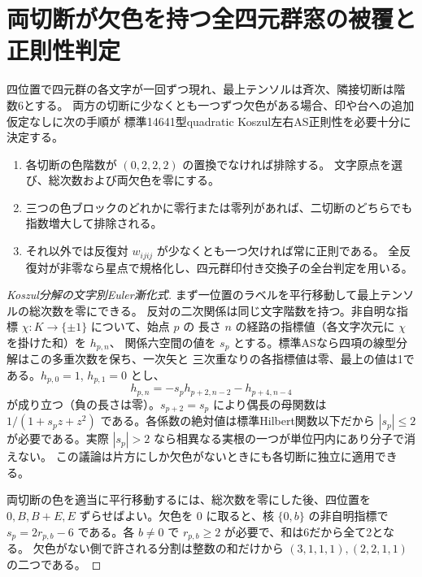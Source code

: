 \section{両切断が欠色を持つ全四元群窓の被覆と正則性判定}
\label{sec:klein-missing-color-coverage}
\begin{theorem}\label{thm:klein-missing-color-coverage}
四位置で四元群の各文字が一回ずつ現れ、最上テンソルは斉次、隣接切断は階数6とする。
両方の切断に少なくとも一つずつ欠色がある場合、印や台への追加仮定なしに次の手順が
標準14641型quadratic Koszul左右AS正則性を必要十分に決定する。
\begin{enumerate}
\item 各切断の色階数が $(0,2,2,2)$ の置換でなければ排除する。
文字原点を選び、総次数および両欠色を零にする。
\item 三つの色ブロックのどれかに零行または零列があれば、二切断のどちらでも指数増大して排除される。
\item それ以外では反復対 $w_{ijij}$ が少なくとも一つ欠ければ常に正則である。
全反復対が非零なら星点で規格化し、四元群印付き交換子の全台判定を用いる。
\end{enumerate}
\end{theorem}
\begin{proof}[Koszul分解の文字別Euler漸化式]
まず一位置のラベルを平行移動して最上テンソルの総次数を零にできる。
反対の二次関係は同じ文字階数を持つ。非自明な指標 $\chi:K\to\{\pm1\}$ について、始点 $p$ の
長さ $n$ の経路の指標値（各文字次元に $\chi$ を掛けた和）を $h_{p,n}$、
関係六空間の値を $s_p$ とする。標準ASなら四項の線型分解はこの多重次数を保ち、一次矢と
三次重なりの各指標値は零、最上の値は1である。$h_{p,0}=1$, $h_{p,1}=0$ とし、
\[
           h_{p,n}=-s_p h_{p+2,n-2}-h_{p+4,n-4}
\]
が成り立つ（負の長さは零）。$s_{p+2}=s_p$ により偶長の母関数は
$1/(1+s_p z+z^2)$ である。各係数の絶対値は標準Hilbert関数以下だから
$|s_p|\le2$ が必要である。実際 $|s_p|>2$ なら相異なる実根の一つが単位円内にあり分子で消えない。
この議論は片方にしか欠色がないときにも各切断に独立に適用できる。

両切断の色を適当に平行移動するには、総次数を零にした後、四位置を
$0,B,B+E,E$ ずらせばよい。欠色を $0$ に取ると、核 $\{0,b\}$ の非自明指標で
$s_p=2r_{p,b}-6$ である。各 $b\ne0$ で $r_{p,b}\ge2$ が必要で、和は6だから全て2となる。
欠色がない側で許される分割は整数の和だけから $(3,1,1,1),(2,2,1,1)$ の二つである。
\end{proof}

